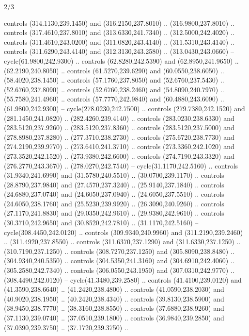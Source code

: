 \begin{flagdescription}{2/3}
\begin{scope}[xshift=0.5\flaglength,yshift=0.5\flagwidth,scale=\stretchfactor]
\begin{scope}[scale=0.001645\flagwidth,yshift=65mm,xshift=-63mm]
\begin{scope}[y=0.80pt, x=0.80pt, yscale=-1,]
\begin{scope}[cm={{1.33333,0.0,0.0,1.33333,(0.0,1e-05)}}]
  controls (314.1130,239.1450) and (316.2150,237.8010) .. (316.9800,237.8010) ..
  controls (317.4610,237.8010) and (313.6330,241.7340) .. (312.5000,242.4020) ..
  controls (311.4610,243.0200) and (311.0820,243.4140) .. (311.5310,243.4140) ..
  controls (311.6290,243.4140) and (312.3130,243.2580) .. (313.0430,243.0660) --
  cycle(61.9800,242.9300) .. controls (62.8280,242.5390) and (62.8950,241.9650)
  .. (62.2190,240.8050) .. controls (61.5270,239.6290) and (60.0550,238.6050) ..
  (58.4020,238.1450) .. controls (57.1760,237.8050) and (52.6760,237.5430) ..
  (52.6760,237.8090) .. controls (52.6760,238.2460) and (54.8090,240.7970) ..
  (55.7580,241.4960) .. controls (57.7770,242.9840) and (60.4880,243.6090) ..
  (61.9800,242.9300) -- cycle(278.0230,242.7500) .. controls (279.7380,242.1520)
  and (281.1450,241.0820) .. (282.4260,239.4140) .. controls (283.0230,238.6330)
  and (283.5120,237.9260) .. (283.5120,237.8360) .. controls (283.5120,237.5000)
  and (278.8980,237.8280) .. (277.3710,238.2730) .. controls (275.6720,238.7730)
  and (274.2190,239.9770) .. (273.6410,241.3710) .. controls (273.3360,242.1020)
  and (273.3520,242.1520) .. (273.9380,242.6600) .. controls (274.7190,243.3320)
  and (276.2770,243.3670) .. (278.0270,242.7540) -- cycle(31.1170,242.5160) ..
  controls (31.9340,241.6990) and (31.5780,240.5510) .. (30.0700,239.1170) ..
  controls (28.8790,237.9840) and (27.4570,237.3240) .. (25.9140,237.1840) ..
  controls (24.6880,237.0740) and (24.6050,237.0940) .. (24.6050,237.5510) ..
  controls (24.6050,238.1760) and (25.5230,239.9920) .. (26.3090,240.9260) ..
  controls (27.1170,241.8830) and (29.0350,242.9610) .. (29.9380,242.9610) ..
  controls (30.3710,242.9650) and (30.8520,242.7810) .. (31.1170,242.5160) --
  cycle(308.4450,242.0120) .. controls (309.9340,240.9960) and
  (311.2190,239.2460) .. (311.4920,237.8550) .. controls (311.6370,237.1290) and
  (311.6330,237.1250) .. (310.7190,237.1250) .. controls (308.7270,237.1250) and
  (305.8090,238.8480) .. (304.9340,240.5350) .. controls (304.5350,241.3160) and
  (304.6910,242.4060) .. (305.2580,242.7340) .. controls (306.0550,243.1950) and
  (307.0310,242.9770) .. (308.4490,242.0120) -- cycle(41.3480,239.2580) ..
  controls (41.4100,239.0120) and (41.3590,238.6640) .. (41.2420,238.4800) ..
  controls (41.0590,238.2030) and (40.9020,238.1950) .. (40.2420,238.4340) ..
  controls (39.8130,238.5900) and (38.9450,238.7770) .. (38.3160,238.8550) ..
  controls (37.6880,238.9260) and (37.1130,239.0740) .. (37.0510,239.1800) ..
  controls (36.9840,239.2850) and (37.0390,239.3750) .. (37.1720,239.3750) ..

\end{scope}
\end{scope}
\end{scope}
\end{scope}
\end{flagdescription}
